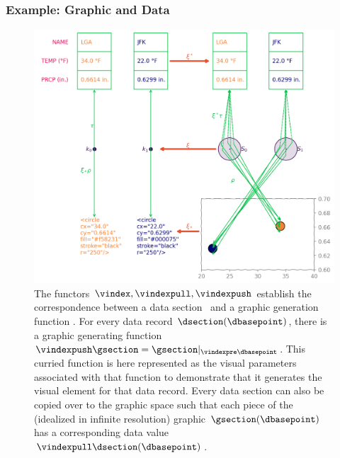\documentclass[10pt,journal,compsoc]{IEEEtran}
\theoremstyle{definition}
\theoremstyle{remark}
\begin{document}
\subsubsection{Example: Graphic and Data}
\begin{figure}[h!]
  \includegraphics*[width=1\columnwidth]{xi_scatter.png}
  \caption{The functors $\vindex, \vindexpull, \vindexpush$ establish the correspondence between a data section \dsection\ and a graphic generation function \gsection. For every data record $\dsection(\dbasepoint)$, there is a graphic generating function $\vindexpush\gsection = \gsection|_{\vindexpre\dbasepoint}$. This curried function is here represented as the visual parameters associated with that function to demonstrate that it generates the visual element for that data record. Every data section can also be copied over to the graphic space such that each piece of the (idealized in infinite resolution) graphic $\gsection(\dbasepoint)$ has a corresponding data value $\vindexpull\dsection(\dbasepoint)$.
  \label{fig:atct:morphisms:sheaf}}
\end{figure}
\end{document}
